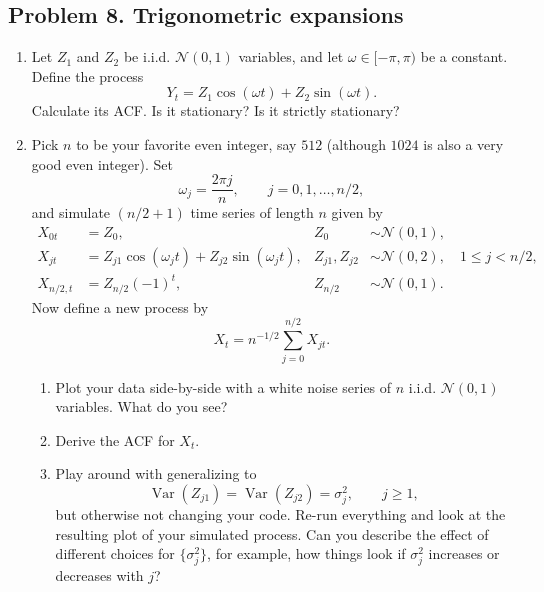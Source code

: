 \documentclass[lang=en,11pt,a4paper,citestyle =authoryear]{elegantpaper}
\begin{document}
\subsection*{Problem 8. Trigonometric expansions}

\begin{enumerate}[label=\alph*.]
    \item
    Let $Z_1$ and $Z_2$ be i.i.d. $\mathcal{N}(0,1)$ variables, and
    let $\omega\in[-\pi,\pi)$ be a constant. Define the process
    \[
    Y_t=Z_1\cos(\omega t)+Z_2\sin(\omega t).
    \]
    Calculate its ACF. Is it stationary? Is it strictly stationary?

    \item
    Pick $n$ to be your favorite even integer, say $512$ (although
    $1024$ is also a very good even integer). Set
    \[
    \omega_j=\frac{2\pi j}{n},
    \qquad j=0,1,\ldots,n/2,
    \]
    and simulate $(n/2+1)$ time series of length $n$ given by
    \begin{align*}
    X_{0t}
      &=Z_0,
      & Z_0&\sim\mathcal{N}(0,1),\\
    X_{jt}
      &=Z_{j1}\cos(\omega_jt)+Z_{j2}\sin(\omega_jt),
      & Z_{j1},Z_{j2}&\sim\mathcal{N}(0,2),
      \quad 1\le j<n/2,\\
    X_{n/2,t}
      &=Z_{n/2}(-1)^t,
      & Z_{n/2}&\sim\mathcal{N}(0,1).
    \end{align*}
    Now define a new process by
    \[
    X_t=n^{-1/2}\sum_{j=0}^{n/2}X_{jt}.
    \]

    \begin{enumerate}[label=\arabic*.]
        \item
        Plot your data side-by-side with a white noise series of $n$
        i.i.d. $\mathcal{N}(0,1)$ variables. What do you see?

        \item
        Derive the ACF for $X_t$.

        \item
        Play around with generalizing to
        \[
        \operatorname{Var}(Z_{j1})
        =\operatorname{Var}(Z_{j2})
        =\sigma_j^2,
        \qquad j\ge1,
        \]
        but otherwise not changing your code. Re-run everything and
        look at the resulting plot of your simulated process. Can you
        describe the effect of different choices for
        $\{\sigma_j^2\}$, for example, how things look if
        $\sigma_j^2$ increases or decreases with $j$?
    \end{enumerate}
\end{enumerate}
\end{document}
